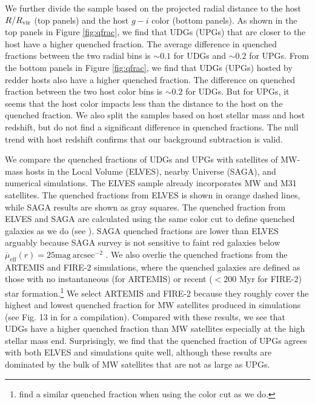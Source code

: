 \documentclass[twocolumn,astrosymb,twocolappendix]{aastex631}
\newcommand{\sbunit}{\mathrm{mag\ arcsec}^{-2}}
\newcommand{\sbeffr}{\overline{\mu}_{\mathrm{eff}}(r)}
\begin{document}
\begin{CJK*}{UTF8}{gbsn}
We further divide the sample based on the projected radial distance to the host $R/R_{\rm vir}$ (top panels) and the host $g-i$ color (bottom panels). As shown in the top panels in Figure \ref{fig:qfrac}, we find that UDGs (UPGs) that are closer to the host have a higher quenched fraction. The average difference in quenched fractions between the two radial bins is $\sim 0.1$ for UDGs and $\sim 0.2$ for UPGs. 
From the bottom panels in Figure \ref{fig:qfrac}, we find that UDGs (UPGs) hosted by redder hosts also have a higher quenched fraction. The difference on quenched fraction between the two host color bins is $\sim 0.2$ for UDGs. But for UPGs, it seems that the host color impacts less than the distance to the host on the quenched fraction. 
We also split the samples based on host stellar mass and host redshift, but do not find a significant difference in quenched fractions. The null trend with host redshift confirms that our background subtraction is valid.


We compare the quenched fractions of UDGs and UPGs with satellites of MW-mass hosts in the Local Volume (ELVES), nearby Universe (SAGA), and numerical simulations. The ELVES sample already incorporates MW and M31 satellites. The quenched fractions from ELVES is shown in orange dashed lines, while SAGA results are shown as gray squares. The quenched fraction from ELVES and SAGA are calculated using the same color cut to define quenched galaxies as we do (see \citealt{CarlstenELVES2022}). 
SAGA quenched fractions are lower than ELVES arguably because SAGA survey is not sensitive to faint red galaxies below $\sbeffr = 25\sbunit$ \citep{CarlstenELVES2022,Font2022}. 
We also overlie the quenched fractions from the ARTEMIS \citep[purple lines,][]{Font2022} and FIRE-2 \citep[pink dotted lines,][]{Samuel2022} simulations, where the quenched galaxies are defined as those with no instantaneous (for ARTEMIS) or recent ($<200$ Myr for FIRE-2) star formation.\footnote{\citet{Font2022} find a similar quenched fraction when using the color cut as we do.} We select ARTEMIS and FIRE-2 because they roughly cover the highest and lowest quenched fraction for MW satellites produced in simulations (see Fig. 13 in \citealt{Samuel2022} for a compilation). Compared with these results, we see that UDGs have a higher quenched fraction than MW satellites especially at the high stellar mass end. Surprisingly, we find that the quenched fraction of UPGs agrees with both 
ELVES and simulations quite well, although these results are dominated by the bulk of MW satellites that are not as large as UPGs. 


\end{CJK*}
\end{document}
